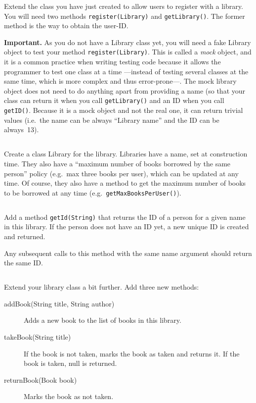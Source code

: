 \documentclass{article}
\begin{document}
Extend the class you have just created to allow users to register with
a library. You will need two methods \verb+register(Library)+
and \verb+getLibrary()+. The former method is the way to obtain the
user-ID. 

\textbf{Important.} As you do not have a Library class yet, you will need a fake
Library object to test your method \verb+register(Library)+. This is called a
\emph{mock} object, and it is a common practice when writing testing
code because it allows the programmer to test one class at a time
---instead of testing several classes at the same time, which is more
complex and thus error-prone---. 
The mock library object does not need to do anything apart from
providing a name (so that your class can return it when you call
\verb+getLibrary()+ and an ID when you call \verb+getID()+. Because it
is a mock object and not the real one, it can return trivial values
(i.e.~the name can be always ``Library name'' and the ID can be
always~13).  

\subsection{}

Create a class Library for the library. Libraries have a name, set at
construction time. They also have a ``maximum number of books borrowed
by the same person'' policy (e.g.~max three books per user), 
which can be updated at any time. Of
course, they also have a method to get the maximum number of books to
be borrowed at any time (e.g.~\verb+getMaxBooksPerUser()+). 

\subsection{}

Add a method \verb+getId(String)+ that returns the ID of a person for
a given name in this library. If the person does not have an ID yet,
a new unique ID is created and returned. 

Any subsequent calls to this
method with the same name argument should return the same ID. 

\subsection{}

Extend your library class a bit further. Add three new methods: 

\begin{description}
\item[addBook(String title, String author)] Adds a new book to the
  list of books in this library.
\item[takeBook(String title)] If the book is not taken, marks the book
  as taken and returns it. If the book is taken, null is returned.
\item[returnBook(Book book)] Marks the book as not taken. 
\end{description}
\end{document}
